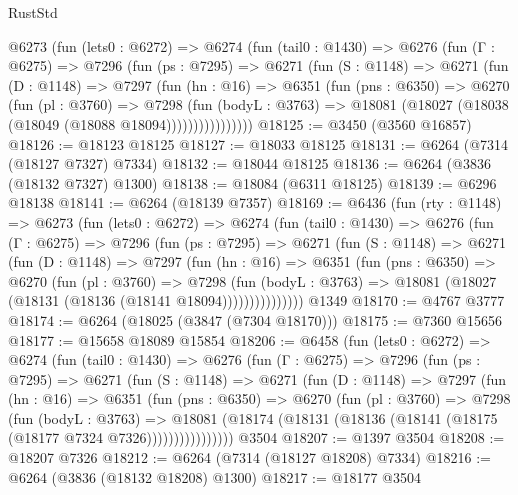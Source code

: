 \begin{lexlean}{RustStd}
\begin{coremodule}
      @6273
        (fun (lets0 : @6272) =>
        @6274
          (fun (tail0 : @1430) =>
          @6276
            (fun (Γ : @6275) =>
            @7296
              (fun (ps : @7295) =>
              @6271
                (fun (S : @1148) =>
                @6271
                  (fun (D : @1148) =>
                  @7297
                    (fun (hn : @16) =>
                    @6351
                      (fun (pns : @6350) =>
                      @6270
                        (fun (pl : @3760) =>
                        @7298
                          (fun (bodyL : @3763) =>
                          @18081 (@18027 (@18038 (@18049 (@18088 @18094))))))))))))))))
@18125 := @3450 (@3560 @16857)
@18126 := @18123 @18125
@18127 := @18033 @18125
@18131 := @6264 (@7314 (@18127 @7327) @7334)
@18132 := @18044 @18125
@18136 := @6264 (@3836 (@18132 @7327) @1300)
@18138 := @18084 (@6311 @18125)
@18139 := @6296 @18138
@18141 := @6264 (@18139 @7357)
@18169 := @6436
    (fun (rty : @1148) =>
    @6273
      (fun (lets0 : @6272) =>
      @6274
        (fun (tail0 : @1430) =>
        @6276
          (fun (Γ : @6275) =>
          @7296
            (fun (ps : @7295) =>
            @6271
              (fun (S : @1148) =>
              @6271
                (fun (D : @1148) =>
                @7297
                  (fun (hn : @16) =>
                  @6351
                    (fun (pns : @6350) =>
                    @6270
                      (fun (pl : @3760) =>
                      @7298
                        (fun (bodyL : @3763) =>
                        @18081 (@18027 (@18131 (@18136 (@18141 @18094)))))))))))))))
    @1349
@18170 := @4767 @3777
@18174 := @6264 (@18025 (@3847 (@7304 @18170)))
@18175 := @7360 @15656
@18177 := @15658 @18089 @15854
@18206 := @6458
    (fun (lets0 : @6272) =>
    @6274
      (fun (tail0 : @1430) =>
      @6276
        (fun (Γ : @6275) =>
        @7296
          (fun (ps : @7295) =>
          @6271
            (fun (S : @1148) =>
            @6271
              (fun (D : @1148) =>
              @7297
                (fun (hn : @16) =>
                @6351
                  (fun (pns : @6350) =>
                  @6270
                    (fun (pl : @3760) =>
                    @7298
                      (fun (bodyL : @3763) =>
                      @18081
                        (@18174 (@18131 (@18136 (@18141 (@18175 (@18177 @7324 @7326))))))))))))))))
    @3504
@18207 := @1397 @3504
@18208 := @18207 @7326
@18212 := @6264 (@7314 (@18127 @18208) @7334)
@18216 := @6264 (@3836 (@18132 @18208) @1300)
@18217 := @18177 @3504

\end{coremodule}
\end{lexlean}
